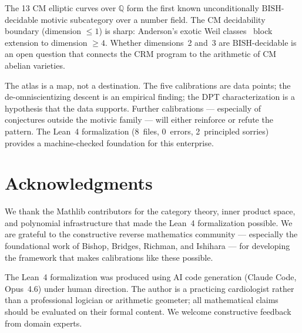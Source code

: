 \documentclass[11pt]{article}
\theoremstyle{definition}
\theoremstyle{remark}
\newcommand{\Q}{\mathbb{Q}}
\newcommand{\BISH}{\mathrm{BISH}}
\newcommand{\CRM}{\mathrm{CRM}}
\begin{document}
\noindent The 13 CM elliptic curves over $\Q$ form the first known unconditionally $\BISH$-decidable motivic subcategory over a number field. The CM decidability boundary (dimension $\leq 1$) is sharp: Anderson's exotic Weil classes~\cite{Anderson1993} block extension to dimension $\geq 4$. Whether dimensions~2 and~3 are $\BISH$-decidable is an open question that connects the $\CRM$ program to the arithmetic of CM abelian varieties.

The atlas is a map, not a destination. The five calibrations are data points; the de-omniscientizing descent is an empirical finding; the DPT characterization is a hypothesis that the data supports. Further calibrations --- especially of conjectures outside the motivic family --- will either reinforce or refute the pattern. The Lean~4 formalization (8~files, 0~errors, 2~principled sorries) provides a machine-checked foundation for this enterprise.

\section*{Acknowledgments}

We thank the Mathlib contributors for the category theory, inner product space, and polynomial infrastructure that made the Lean~4 formalization possible. We are grateful to the constructive reverse mathematics community --- especially the foundational work of Bishop, Bridges, Richman, and Ishihara --- for developing the framework that makes calibrations like these possible.

The Lean~4 formalization was produced using AI code generation (Claude Code, Opus~4.6) under human direction. The author is a practicing cardiologist rather than a professional logician or arithmetic geometer; all mathematical claims should be evaluated on their formal content. We welcome constructive feedback from domain experts.
\end{document}

